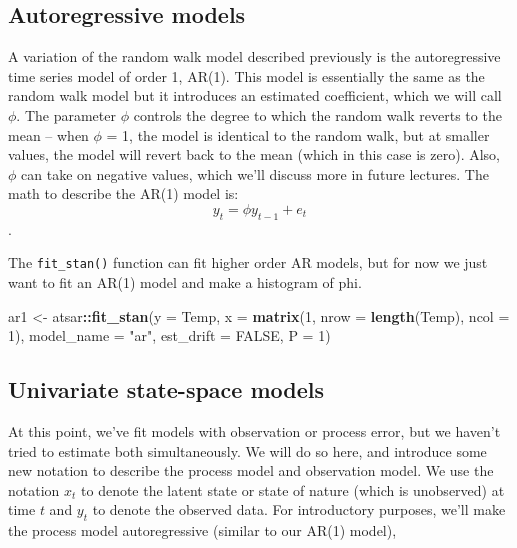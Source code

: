 \documentclass[
]{article}
\newenvironment{Shaded}{\begin{snugshade}}{\end{snugshade}}
\newcommand{\DataTypeTok}[1]{\textcolor[rgb]{0.13,0.29,0.53}{#1}}
\newcommand{\DecValTok}[1]{\textcolor[rgb]{0.00,0.00,0.81}{#1}}
\newcommand{\KeywordTok}[1]{\textcolor[rgb]{0.13,0.29,0.53}{\textbf{#1}}}
\newcommand{\NormalTok}[1]{#1}
\newcommand{\OperatorTok}[1]{\textcolor[rgb]{0.81,0.36,0.00}{\textbf{#1}}}
\newcommand{\OtherTok}[1]{\textcolor[rgb]{0.56,0.35,0.01}{#1}}
\newcommand{\StringTok}[1]{\textcolor[rgb]{0.31,0.60,0.02}{#1}}
\begin{document}
\hypertarget{sec-stan-ar1}{%
\subsection{Autoregressive models}\label{sec-stan-ar1}}

A variation of the random walk model described previously is the
autoregressive time series model of order 1, AR(1). This model is
essentially the same as the random walk model but it introduces an
estimated coefficient, which we will call \(\phi\). The parameter
\(\phi\) controls the degree to which the random walk reverts to the
mean -- when \(\phi\) = 1, the model is identical to the random walk,
but at smaller values, the model will revert back to the mean (which in
this case is zero). Also, \(\phi\) can take on negative values, which
we'll discuss more in future lectures. The math to describe the AR(1)
model is: \[y_t = \phi y_{t-1} + e_{t}\].

The \texttt{fit\_stan()} function can fit higher order AR models, but
for now we just want to fit an AR(1) model and make a histogram of phi.

\begin{Shaded}
\begin{Highlighting}[]
\NormalTok{ar1 <-}\StringTok{ }\NormalTok{atsar}\OperatorTok{::}\KeywordTok{fit_stan}\NormalTok{(}\DataTypeTok{y =}\NormalTok{ Temp, }\DataTypeTok{x =} \KeywordTok{matrix}\NormalTok{(}\DecValTok{1}\NormalTok{, }\DataTypeTok{nrow =} \KeywordTok{length}\NormalTok{(Temp), }
    \DataTypeTok{ncol =} \DecValTok{1}\NormalTok{), }\DataTypeTok{model_name =} \StringTok{"ar"}\NormalTok{, }\DataTypeTok{est_drift =} \OtherTok{FALSE}\NormalTok{, }\DataTypeTok{P =} \DecValTok{1}\NormalTok{)}
\end{Highlighting}
\end{Shaded}

\hypertarget{sec-stan-uss}{%
\subsection{Univariate state-space models}\label{sec-stan-uss}}

At this point, we've fit models with observation or process error, but
we haven't tried to estimate both simultaneously. We will do so here,
and introduce some new notation to describe the process model and
observation model. We use the notation \({x_t}\) to denote the latent
state or state of nature (which is unobserved) at time \(t\) and
\({y_t}\) to denote the observed data. For introductory purposes, we'll
make the process model autoregressive (similar to our AR(1) model),
\end{document}
